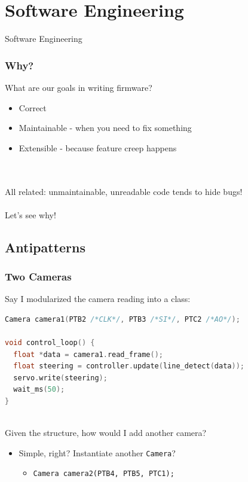 \documentclass{beamer}
\begin{document}
\section{Software Engineering} %
\begin{frame}
\centering \huge Software Engineering
\end{frame}


\begin{frame}
\frametitle{Why?}
What are our goals in writing firmware?

 {
\begin{itemize}
  \item Correct
  \item Maintainable - when you need to fix something
  \item Extensible - because feature creep happens
\end{itemize}
\hfill \\
\hfill \\
All related: unmaintainable, unreadable code tends to hide bugs! \\
\hfill \\
\centering Let's see why!
}
\end{frame}


\subsection{Antipatterns}
\begin{frame}[fragile]
\frametitle{Two Cameras}
Say I modularized the camera reading into a class:
\begin{lstlisting}[language=C++,basicstyle=\ttfamily\scriptsize]
Camera camera1(PTB2 /*CLK*/, PTB3 /*SI*/, PTC2 /*AO*/);

void control_loop() {
  float *data = camera1.read_frame();
  float steering = controller.update(line_detect(data));
  servo.write(steering);
  wait_ms(50);
}
\end{lstlisting}
\hfill \\
Given the structure, how would I add another camera?
\hfill \\
\begin{itemize}
  \item<2-> Simple, right? Instantiate another \texttt{Camera}?
  \begin{itemize}
    \item \texttt{Camera camera2(PTB4, PTB5, PTC1);}
  \end{itemize}
\end{itemize}
\hfill \\
\end{frame}
\end{document}
